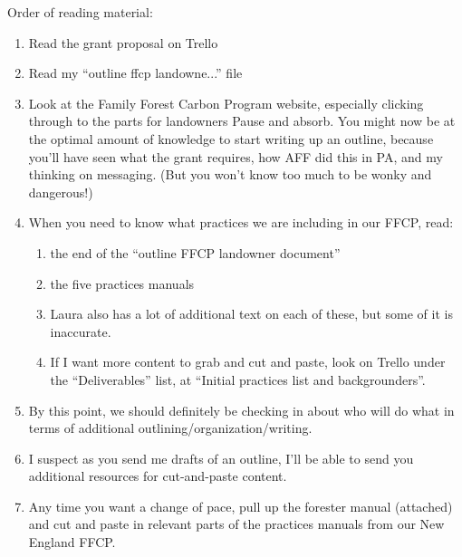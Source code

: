 \documentclass{article}\usepackage[]{graphicx}\usepackage[]{color}
\begin{document}
Order of reading material:
\begin{enumerate}
\item Read the grant proposal on Trello
\item Read my ``outline ffcp landowne...'' file
\item Look at the Family Forest Carbon Program website, especially clicking through to the parts for landowners
Pause and absorb. You might now be at the optimal amount of knowledge to start writing up an outline, because you’ll have seen what the grant requires, how AFF did this in PA, and my thinking on messaging. (But you won’t know too much to be wonky and dangerous!)
\item When you need to know what practices we are including in our FFCP, read:
  \begin{enumerate}
  \item the end of the ``outline FFCP landowner document''
  \item the five practices manuals
  \item Laura also has a lot of additional text on each of these, but some of it is inaccurate. 
  \item If I want more content to grab and cut and paste, look on Trello under the ``Deliverables'' list, at ``Initial practices list and backgrounders''.
  \end{enumerate}
\item By this point, we should definitely be checking in about who will do what in terms of additional outlining/organization/writing. 
\item I suspect as you send me drafts of an outline, I’ll be able to send you additional resources for cut-and-paste content.
\item Any time you want a change of pace, pull up the forester manual (attached) and cut and paste in relevant parts of the practices manuals from our New England FFCP.
\end{enumerate}

  
  
\end{document}
